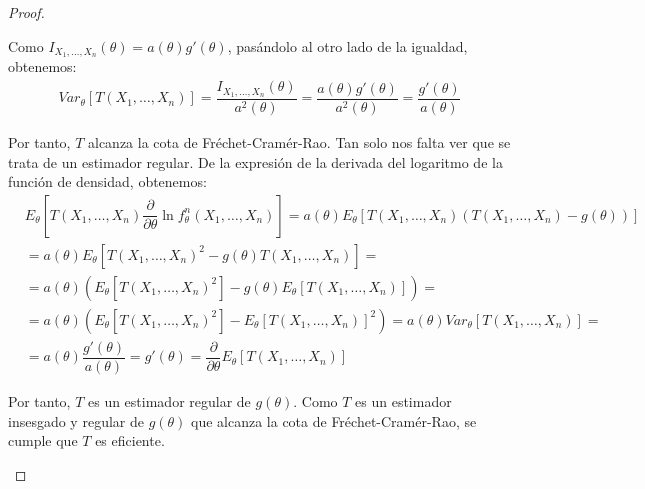 \begin{teo}
\begin{proof}
\begin{description}
            Como $I_{X_1,\ldots,X_n}(\theta)=a(\theta)g'(\theta)$, pasándolo al otro lado de la igualdad, obtenemos:
            \begin{align*}
                Var_\theta[T(X_1,\ldots,X_n)] = \dfrac{I_{X_1,\ldots,X_n}(\theta)}{a^2(\theta)} = \dfrac{a(\theta)g'(\theta)}{a^2(\theta)} = \dfrac{g'(\theta)}{a(\theta)}
            \end{align*}

            Por tanto, $T$ alcanza la cota de Fréchet-Cramér-Rao. Tan solo nos falta ver que se trata de un estimador regular. De la expresión de la derivada del logaritmo de la función de densidad, obtenemos:
            \begin{align*}
                &E_\theta\left[T(X_1,\ldots,X_n)\dfrac{\partial}{\partial\theta}\ln f^n_\theta(X_1,\ldots,X_n)\right] = a(\theta) E_\theta\left[T(X_1,\ldots,X_n)(T(X_1,\ldots,X_n)-g(\theta))\right]
                \\&= a(\theta) E_\theta\left[T(X_1,\ldots,X_n)^2 - g(\theta)T(X_1,\ldots,X_n)\right]
                =\\&= a(\theta) \left(E_\theta\left[T(X_1,\ldots,X_n)^2\right] - g(\theta) E_\theta\left[T(X_1,\ldots,X_n)\right]\right)
                =\\&= a(\theta) \left(E_\theta\left[T(X_1,\ldots,X_n)^2\right] - E_\theta\left[T(X_1,\ldots,X_n)\right]^2\right)
                = a(\theta) Var_\theta[T(X_1,\ldots,X_n)]
                =\\&= a(\theta) \dfrac{g'(\theta)}{a(\theta)} = g'(\theta)
                = \dfrac{\partial}{\partial\theta} E_\theta[T(X_1,\ldots,X_n)]
            \end{align*}

            Por tanto, $T$ es un estimador regular de $g(\theta)$. Como $T$ es un estimador insesgado y regular de $g(\theta)$ que alcanza la cota de Fréchet-Cramér-Rao, se cumple que $T$ es eficiente.\qedhere
        \end{description}
    \end{proof}
    
\end{teo}

